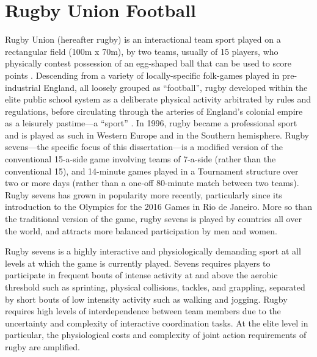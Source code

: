 \section{Rugby Union Football}
Rugby Union (hereafter rugby) is an interactional team sport played on a rectangular field (100m x 70m), by two teams, usually of 15 players, who physically contest possession of an egg-shaped ball that can be used to score points \citep{IRB2014}.  Descending from a variety of locally-specific folk-games played in pre-industrial England, all loosely grouped as ``football'', rugby developed within the elite public school system as a deliberate physical activity arbitrated by rules and regulations, before circulating through the arteries of England's colonial empire as a leisurely pastime—a ``sport'' \citep{Dunning2005}.  In 1996, rugby became a professional sport and is played as such in Western Europe and in the Southern hemisphere. Rugby sevens---the specific focus of this dissertation---is a modified version of the conventional 15-a-side game involving teams of 7-a-side (rather than the conventional 15), and 14-minute games played in a Tournament structure over two or more days (rather than a one-off 80-minute match between two teams).  Rugby sevens has grown in popularity more recently, particularly since its introduction to the Olympics for the 2016 Games in Rio de Janeiro.  More so than the traditional version of the game, rugby sevens is played by countries all over the world, and attracts more balanced participation by men and women.

Rugby sevens is a highly interactive and physiologically demanding sport at all levels at which the game is currently played. Sevens requires players to participate in frequent bouts of intense activity at and above the aerobic threshold such as sprinting, physical collisions, tackles, and grappling, separated by short bouts of low intensity activity such as walking and jogging. Rugby requires high levels of interdependence between team members due to the uncertainty and complexity of interactive coordination tasks.  At the elite level in particular, the physiological costs and complexity of joint action requirements of rugby are amplified.

